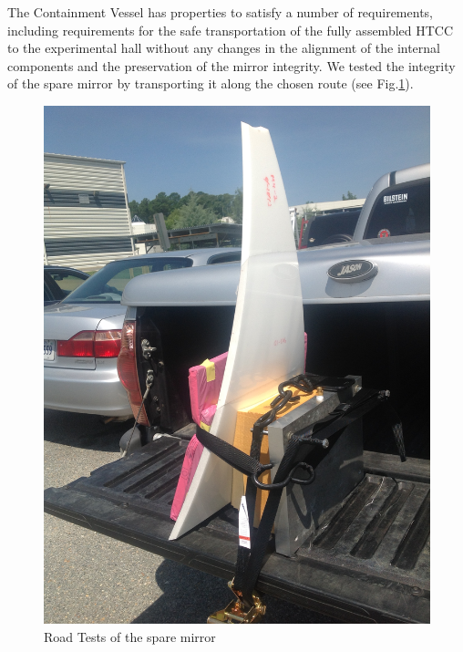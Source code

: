 \indent The Containment Vessel has properties to satisfy a number of requirements, including requirements for the safe transportation of the fully assembled HTCC to the experimental hall without any changes in the alignment of the internal components and the preservation of the mirror integrity. We tested the integrity of the spare mirror by transporting it along the chosen route (see Fig.\ref{fig:transportation_spare_mirror}).

\begin{figure}[h]
    \centering
    \includegraphics[trim={1.5cm 5cm 0 2cm }, clip, width=\linewidth]{images/Road_Test.JPG}
    \caption{Road Tests of the spare mirror}
    \label{fig:transportation_spare_mirror}
\end{figure}

